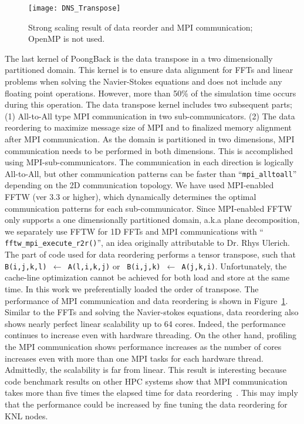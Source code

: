 \begin{figure}
 \begin{center}
   \texttt{[image: DNS\_Transpose]}
   \caption{Strong scaling result of data reorder and MPI communication; OpenMP is not used.}
   \label{fig:DNS_strong_scale_transpose}
 \end{center}
\end{figure}

The last kernel of PoongBack is the data transpose in a two dimensionally
partitioned domain. This kernel is to ensure data alignment for FFTs and
linear problems when solving the Navier-Stokes equations and does not include
any floating point operations. However, more than 50\% of the simulation
time occurs during this operation. The data transpose kernel includes two
subsequent parts; (1) All-to-All type MPI communication in two
sub-communicators. (2) The data reordering to maximize message size of
MPI and to finalized memory alignment after MPI communication. As the
domain is partitioned in two dimensions, MPI communication needs to be
performed in both dimensions. This is accomplished using MPI-sub-communicators. 
The communication in each direction is logically All-to-All, but other communication
patterns can be faster than ``{\tt mpi\_alltoall}'' depending on the 2D
communication topology. We have used MPI-enabled FFTW (ver 3.3 or
higher), which dynamically determines the optimal communication patterns for each
sub-communicator. Since MPI-enabled FFTW only supports a one dimensionally
partitioned domain, a.k.a plane decomposition, we separately use
FFTW for 1D FFTs and MPI communications with ``{\tt
fftw\_mpi\_execute\_r2r()}'', an idea originally attributable to Dr. Rhys
Ulerich. The part of code used for data reordering performs a tensor
transpose, such that {\tt B(i,j,k,l) $\leftarrow$ A(l,i,k,j)} or {\tt
B(i,j,k) $\leftarrow$ A(j,k,i)}. Unfortunately, the cache-line
optimization cannot be achieved for both load and store at the same
time. In this work we preferentially loaded the order of transpose. 
The performance of MPI communication and data reordering is
shown in Figure~\ref{fig:DNS_strong_scale_transpose}. Similar to the FFTs
and solving the Navier-stokes equations, data reordering also shows nearly 
perfect linear scalability up to 64 cores. Indeed, the performance 
continues to increase even with hardware threading. 
On the other hand, profiling the MPI communication shows performance 
increases as the number of cores increases even with more than one 
MPI tasks for each hardware thread. Admittedly, the scalability is far from
linear. This result is interesting because code benchmark results
on other HPC systems show that MPI communication takes more than five
times the elapsed time for data reordering~\cite{Lee:2013kv}. This
may imply that the performance could be increased by fine tuning 
the data reordering for KNL nodes. 

